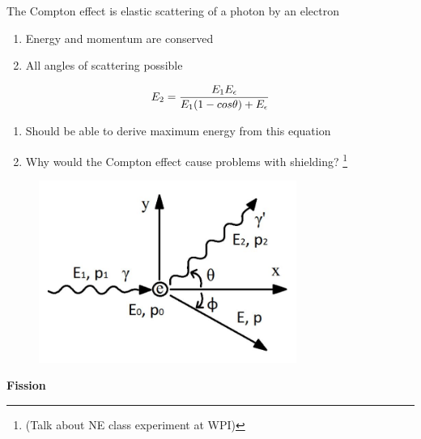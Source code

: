 \documentclass[aspectratio=1610,pdftex,dvipsnames,compress,xcolor={dvipsnames}]{beamer}
\begin{document}
\addtocounter{framenumber}{-1} 
\begin{frame}{The Compton effect is elastic scattering of a photon by an electron}
    \begin{enumerate}[series=outerlist,topsep=0pt,itemsep=21pt,leftmargin=*,label=(\arabic*)]
        \item[]Energy and momentum are conserved
        \item[]All angles of scattering possible
    \end{enumerate}

    \begin{equation}
        \LARGE
        E_2 = \frac{E_1 E_{\epsilon}}{E_1 (1 - cos \theta) + E_{\epsilon}}
    \end{equation}

    \vspace*{\fill}

    \begin{enumerate}[series=outerlist,topsep=0pt,itemsep=21pt,leftmargin=*,label=(\arabic*)]
        \item[]Should be able to derive maximum energy from this equation
        \item[]Why would the Compton effect cause problems with shielding?
            \footnote[frame]{\tiny(Talk about NE class experiment at WPI)}
    \end{enumerate}
\end{frame}


\begin{frame}{}
    \begin{figure}
        \centering
        \includegraphics[width=0.75\textwidth]{scattering.jpg}
    \end{figure}
\end{frame}


\begin{frame}[plain]{}
    \centering\LARGE\textbf{Fission}
\end{frame}
\end{document}
